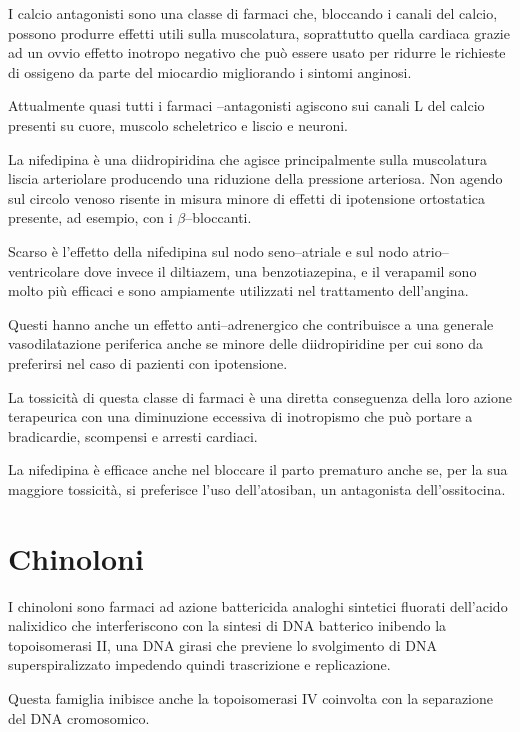 I calcio antagonisti sono una classe di farmaci che, bloccando i canali del calcio, possono produrre effetti utili sulla muscolatura, soprattutto quella cardiaca grazie ad un ovvio effetto inotropo negativo che può essere usato per ridurre le richieste di ossigeno da parte del miocardio migliorando i sintomi anginosi.

Attualmente quasi tutti i farmaci --antagonisti agiscono sui canali L del calcio presenti su cuore, muscolo scheletrico e liscio e neuroni.

La nifedipina è una diidropiridina che agisce principalmente sulla muscolatura liscia arteriolare producendo una riduzione della pressione arteriosa. Non agendo sul circolo venoso risente in misura minore di effetti di ipotensione ortostatica presente, ad esempio, con i $\beta$--bloccanti. 

Scarso è l'effetto della nifedipina sul nodo seno--atriale e sul nodo atrio--ventricolare dove invece il diltiazem, una benzotiazepina, e il verapamil sono molto più efficaci e sono ampiamente utilizzati nel trattamento dell'angina.

Questi hanno anche un effetto anti--adrenergico che contribuisce a una generale vasodilatazione periferica anche se minore delle diidropiridine per cui sono da preferirsi nel caso di pazienti con ipotensione.

La tossicità di questa classe di farmaci è una diretta conseguenza della loro azione terapeurica con una diminuzione eccessiva di inotropismo che può portare a bradicardie, scompensi e arresti cardiaci.

La nifedipina è efficace anche nel bloccare il parto prematuro anche se, per la sua maggiore tossicità, si preferisce l'uso dell'atosiban, un antagonista dell'ossitocina.

\section{Chinoloni}

I chinoloni sono farmaci ad azione battericida analoghi sintetici fluorati dell'acido nalixidico che interferiscono con la sintesi di DNA batterico inibendo la topoisomerasi II, una DNA girasi che previene lo svolgimento di DNA superspiralizzato impedendo quindi trascrizione e replicazione.

Questa famiglia inibisce anche la topoisomerasi IV coinvolta con la separazione del DNA cromosomico.

